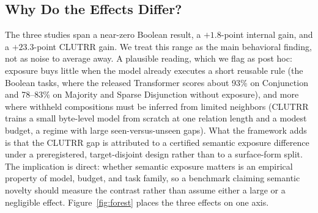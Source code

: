 \subsection{Why Do the Effects Differ?}
\label{sec:why-effects-differ}

The three studies span a near-zero Boolean result, a $+1.8$-point internal
gain, and a $+23.3$-point CLUTRR gain.  We treat this range as the main
behavioral finding, not as noise to average away.  A plausible reading, which
we flag as post hoc: exposure buys little when the model already executes a
short reusable rule (the Boolean tasks, where the released Transformer scores
about 93\% on Conjunction and 78--83\% on Majority and Sparse Disjunction
without exposure), and more where withheld compositions must be inferred from
limited neighbors (CLUTRR trains a small byte-level model from scratch at one
relation length and a modest budget, a regime with large seen-versus-unseen
gaps).  What the framework adds is that the CLUTRR gap is attributed to a
certified semantic exposure difference under a preregistered, target-disjoint
design rather than to a surface-form split.  The implication is direct:
whether semantic exposure matters is an empirical property of model, budget,
and task family, so a benchmark claiming semantic novelty should measure the
contrast rather than assume either a large or a negligible effect.
Figure~\ref{fig:forest} places the three effects on one axis.


